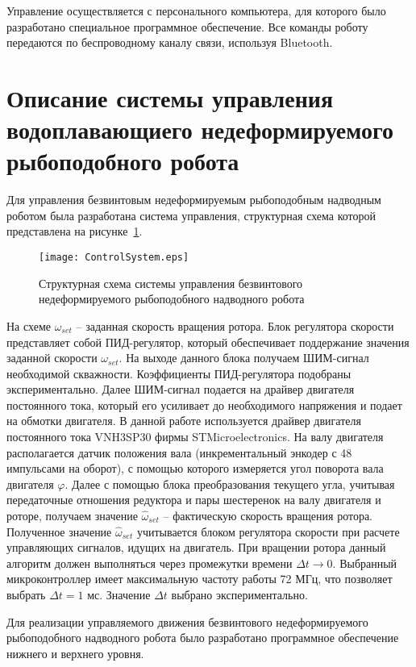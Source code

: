 Управление осуществляется с персонального компьютера, для которого было разработано специальное программное обеспечение. Все команды роботу передаются по беспроводному каналу связи, используя Bluetooth.


\section{Описание системы управления водоплавающиего недеформируемого рыбоподобного робота}

Для управления безвинтовым недеформируемым рыбоподобным надводным роботом была разработана система управления, структурная схема которой представлена на рисунке~\ref{ControlSystem}.

\begin{figure}[!h]
	\centering
	\texttt{[image: ControlSystem.eps]}
	\caption{Структурная схема системы управления безвинтового недеформируемого рыбоподобного надводного робота}
	\label{ControlSystem}
\end{figure}

На схеме $ \omega_{set} $ -- заданная скорость вращения ротора. Блок регулятора скорости представляет собой ПИД-регулятор, который обеспечивает поддержание значения заданной скорости $ \omega_{set} $. На выходе данного блока получаем ШИМ-сигнал необходимой скважности. Коэффициенты ПИД-регулятора подобраны экспериментально. Далее ШИМ-сигнал подается на драйвер двигателя постоянного тока, который его усиливает до необходимого напряжения и подает на обмотки двигателя. В данной работе используется драйвер двигателя постоянного тока VNH3SP30 фирмы STMicroelectronics. На валу двигателя располагается датчик положения вала (инкрементальный энкодер с 48 импульсами на оборот), с помощью которого измеряется угол поворота вала двигателя $ \varphi $. Далее с помощью блока преобразования текущего угла, учитывая передаточные отношения редуктора и пары шестеренок на валу двигателя и роторе, получаем значение $ \hat{\omega}_{set} $ -- фактическую скорость вращения ротора. Полученное значение $ \hat{\omega}_{set} $ учитывается блоком регулятора скорости при расчете управляющих сигналов, идущих на двигатель. При вращении ротора данный алгоритм должен выполняться через промежутки времени $ \Delta t \rightarrow 0 $. Выбранный микроконтроллер имеет максимальную частоту работы 72 МГц, что позволяет выбрать $ \Delta t = 1 $ мс. Значение $ \Delta t $ выбрано экспериментально.

Для реализации управляемого движения безвинтового недеформируемого рыбоподобного надводного робота было разработано программное обеспечение нижнего и верхнего уровня.


